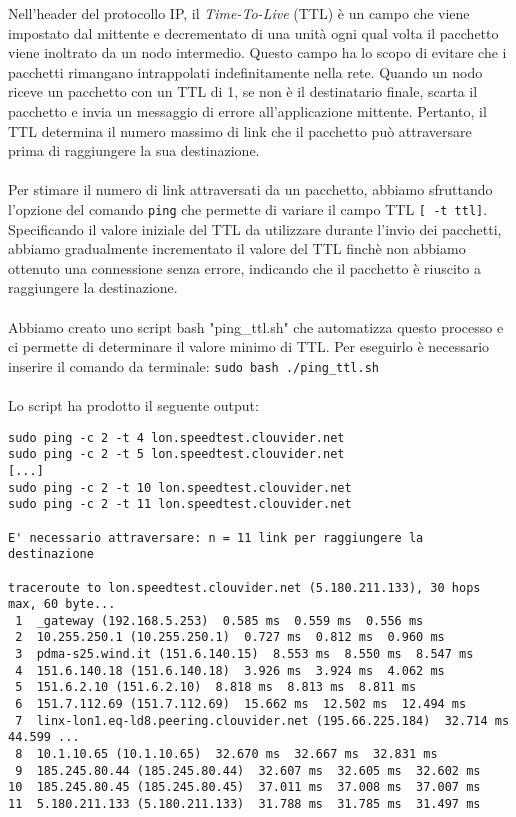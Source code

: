 Nell'header del protocollo IP, il \textit{Time-To-Live} (TTL) è un campo che viene impostato dal mittente e decrementato di una unità ogni qual volta il pacchetto viene inoltrato da un nodo intermedio. Questo campo ha lo scopo di evitare che i pacchetti rimangano intrappolati indefinitamente nella rete. Quando un nodo riceve un pacchetto con un TTL di 1, se non è il destinatario finale, scarta il pacchetto e invia un messaggio di errore all'applicazione mittente. Pertanto, il TTL determina il numero massimo di link che il pacchetto può attraversare prima di raggiungere la sua destinazione.\\\\
Per stimare il numero di link attraversati da un pacchetto, abbiamo sfruttando l'opzione del comando \texttt{ping} che permette di variare il campo TTL \texttt{[ -t ttl]}. Specificando il valore iniziale del TTL da utilizzare durante l'invio dei pacchetti, abbiamo gradualmente incrementato il valore del TTL finchè non abbiamo ottenuto una connessione senza errore, indicando che il pacchetto è riuscito a raggiungere la destinazione. \\\\
Abbiamo creato uno script bash "ping\_ttl.sh" che automatizza questo processo e ci permette di determinare il valore minimo di TTL. Per eseguirlo è necessario inserire il comando da terminale: \texttt{sudo bash ./ping\_ttl.sh}\\\\
Lo script ha prodotto il seguente output:
\begin{verbatim}
sudo ping -c 2 -t 4 lon.speedtest.clouvider.net
sudo ping -c 2 -t 5 lon.speedtest.clouvider.net
[...]
sudo ping -c 2 -t 10 lon.speedtest.clouvider.net
sudo ping -c 2 -t 11 lon.speedtest.clouvider.net

E' necessario attraversare: n = 11 link per raggiungere la destinazione

traceroute to lon.speedtest.clouvider.net (5.180.211.133), 30 hops max, 60 byte...
 1  _gateway (192.168.5.253)  0.585 ms  0.559 ms  0.556 ms
 2  10.255.250.1 (10.255.250.1)  0.727 ms  0.812 ms  0.960 ms
 3  pdma-s25.wind.it (151.6.140.15)  8.553 ms  8.550 ms  8.547 ms
 4  151.6.140.18 (151.6.140.18)  3.926 ms  3.924 ms  4.062 ms
 5  151.6.2.10 (151.6.2.10)  8.818 ms  8.813 ms  8.811 ms
 6  151.7.112.69 (151.7.112.69)  15.662 ms  12.502 ms  12.494 ms
 7  linx-lon1.eq-ld8.peering.clouvider.net (195.66.225.184)  32.714 ms  44.599 ...
 8  10.1.10.65 (10.1.10.65)  32.670 ms  32.667 ms  32.831 ms
 9  185.245.80.44 (185.245.80.44)  32.607 ms  32.605 ms  32.602 ms
10  185.245.80.45 (185.245.80.45)  37.011 ms  37.008 ms  37.007 ms
11  5.180.211.133 (5.180.211.133)  31.788 ms  31.785 ms  31.497 ms
\end{verbatim}
